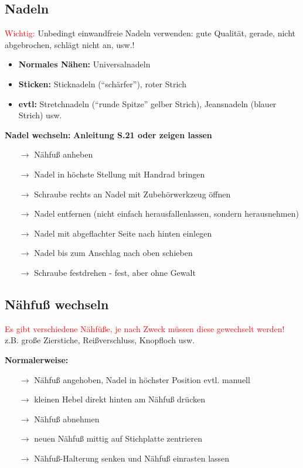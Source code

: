 \documentclass{\basedir/fablab-document}
\newcommand{\pfeil}{\ensuremath{\rightarrow}}
\begin{document}
\subsection{Nadeln}
\textcolor{red}{Wichtig:} Unbedingt einwandfreie Nadeln verwenden: gute Qualität, gerade, nicht abgebrochen, schlägt nicht an, usw.!
\begin{itemize}
 \item \textbf{Normales Nähen:} Universalnadeln
 \item \textbf{Sticken:} Sticknadeln (“schärfer”), roter Strich
 \item \textbf{evtl:} Stretchnadeln (“runde Spitze” gelber Strich), Jeansnadeln (blauer Strich) usw.
\end{itemize}

\vspace{2em}

\textbf{Nadel wechseln:}
\newline \textbf{Anleitung S.21 oder zeigen lassen}
\begin{itemize}
 \item[\pfeil] Nähfuß anheben
 \item[\pfeil] Nadel in höchste Stellung mit Handrad bringen
 \item[\pfeil] Schraube rechts an Nadel mit Zubehörwerkzeug öffnen
 \item[\pfeil] Nadel entfernen (nicht einfach herausfallenlassen, sondern herausnehmen)
 \item[\pfeil] Nadel mit abgeflachter Seite nach hinten einlegen
 \item[\pfeil] Nadel bis zum Anschlag nach oben schieben
 \item[\pfeil] Schraube festdrehen -  fest, aber ohne Gewalt
\end{itemize}

\subsection{Nähfuß wechseln}
\textcolor{red}{Es gibt verschiedene Nähfüße, je nach Zweck müssen diese gewechselt werden! }
\newline z.B. große Zierstiche, Reißverschluss, Knopfloch usw. 

\vspace{2em}

\textbf{Normalerweise:}
\begin{itemize}
 \item[\pfeil] Nähfuß angehoben, Nadel in höchster Position evtl. manuell
 \item[\pfeil] kleinen Hebel direkt hinten am Nähfuß drücken
 \item[\pfeil] Nähfuß abnehmen
 \item[\pfeil] neuen Nähfuß mittig auf Stichplatte zentrieren 
 \item[\pfeil] Nähfuß-Halterung senken und Nähfuß einrasten lassen
\end{itemize}
\end{document}

